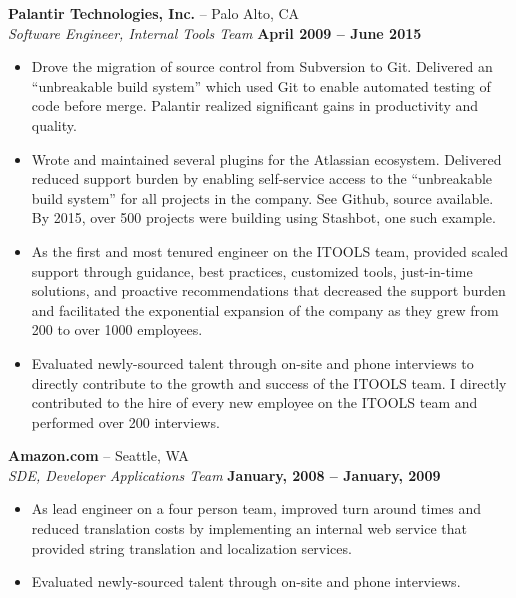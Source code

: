 \documentclass[line, margin]{res}
\begin{document}
\begin{resume}
{\bf Palantir Technologies, Inc.} -- Palo Alto, CA
\\
\textit{Software Engineer, Internal Tools Team} \hfill {\bf April 2009 -- June 2015}
\\
\begin{itemize}
\item
Drove the migration of source control from Subversion to Git.  Delivered an
``unbreakable build system'' which used Git to enable automated testing of code
before merge.  Palantir realized significant gains in productivity and quality.
\item
Wrote and maintained several plugins for the Atlassian ecosystem.  Delivered
reduced support burden by enabling self-service access to the ``unbreakable
build system'' for all projects in the company.  See Github, source available.
By 2015, over 500 projects were building using Stashbot, one such example.
\item
As the first and most tenured engineer on the ITOOLS team, provided scaled
support through guidance, best practices, customized tools, just-in-time
solutions, and proactive recommendations that decreased the support burden and
facilitated the exponential expansion of the company as they grew from 200 to
over 1000 employees.
\item
Evaluated newly-sourced talent through on-site and phone interviews to directly
contribute to the growth and success of the ITOOLS team.  I directly
contributed to the hire of every new employee on the ITOOLS team and performed
over 200 interviews.
\end{itemize}

{\bf Amazon.com} -- Seattle, WA
\\
\textit{SDE, Developer Applications Team} \hfill {\bf January, 2008 -- January, 2009}
\\
\begin{itemize}
\item
As lead engineer on a four person team, improved turn around times and reduced
translation costs by implementing an internal web service that provided string
translation and localization services.
\item
Evaluated newly-sourced talent through on-site and phone interviews.
\end{itemize}


\end{resume}
\end{document}
